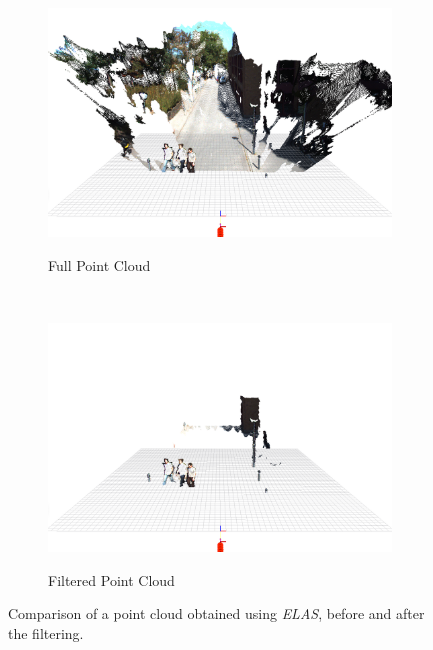 \begin{figure}[t]
        \centering
        \begin{subfigure}[b]{0.475\textwidth}
                \centering
                \caption{Full Point Cloud}
                \includegraphics[width=\textwidth]{fullPointCloud}
                \label{fig:cluster1}
        \end{subfigure}%
        ~ %
        \begin{subfigure}[b]{0.475\textwidth}
                \centering
                \caption{Filtered Point Cloud}
                \includegraphics[width=\textwidth]{filteredPointCloud}
                \label{fig:cluster2}
        \end{subfigure}%
        \caption{Comparison of a point cloud obtained using \emph{ELAS}, before and after the filtering.}\label{fig:clusterization_output}
\end{figure}

